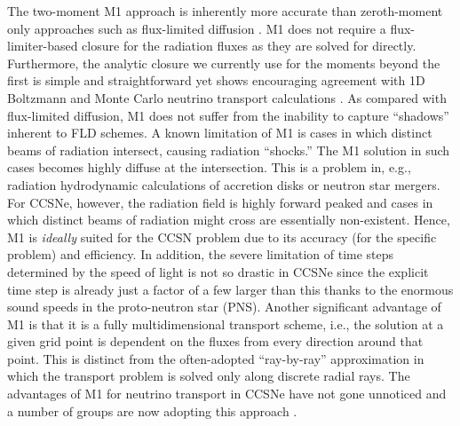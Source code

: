 \documentclass[12pt]{article}
\begin{document}
The two-moment M1 approach is inherently more accurate than zeroth-moment only approaches such as flux-limited diffusion \citep[e.g.,][]{bruenn:2013, Dolence:2015, Lentz:2015}. 
M1 does not require a flux-limiter-based closure for the radiation fluxes as they are solved for directly.
Furthermore, the analytic closure we currently use for the moments beyond the first is simple and straightforward yet shows encouraging agreement with 1D Boltzmann and Monte Carlo neutrino transport calculations \citep{oconnor:2015, Murchikova:2017}.
As compared with flux-limited diffusion, M1 does not suffer from the inability to capture ``shadows'' inherent to FLD schemes.
A known limitation of M1 is cases in which distinct beams of radiation intersect, causing radiation ``shocks.''
The M1 solution in such cases becomes highly diffuse at the intersection.
This is a problem in, e.g., radiation hydrodynamic calculations of accretion disks or neutron star mergers.
For CCSNe, however, the radiation field is highly forward peaked and cases in which distinct beams of radiation might cross are essentially non-existent.
Hence, M1 is {\it ideally} suited for the CCSN problem due to its accuracy (for the specific problem) and efficiency.
In addition, the severe limitation of time steps determined by the speed of light is not so drastic in CCSNe since the explicit time step is already just a factor of a few larger than this thanks to the enormous sound speeds in the proto-neutron star (PNS).
Another significant advantage of M1 is that it is a fully multidimensional transport scheme, i.e., the solution at a given grid point is dependent on the fluxes from every direction around that point.
This is distinct from the often-adopted ``ray-by-ray'' approximation \citep[e.g.,][]{bruenn:2013, bruenn:2016, muller:2012a, Hanke:2013, Melson:2015, Lentz:2015} in which the transport problem is solved only along discrete radial rays.
The advantages of M1 for neutrino transport in CCSNe have not gone unnoticed and a number of groups are now adopting this approach \citep{Just:2015, Kuroda:2016, Skinner:2016, Roberts:2016, vartanyan:2018, vartanyan:2019}.
\end{document}
